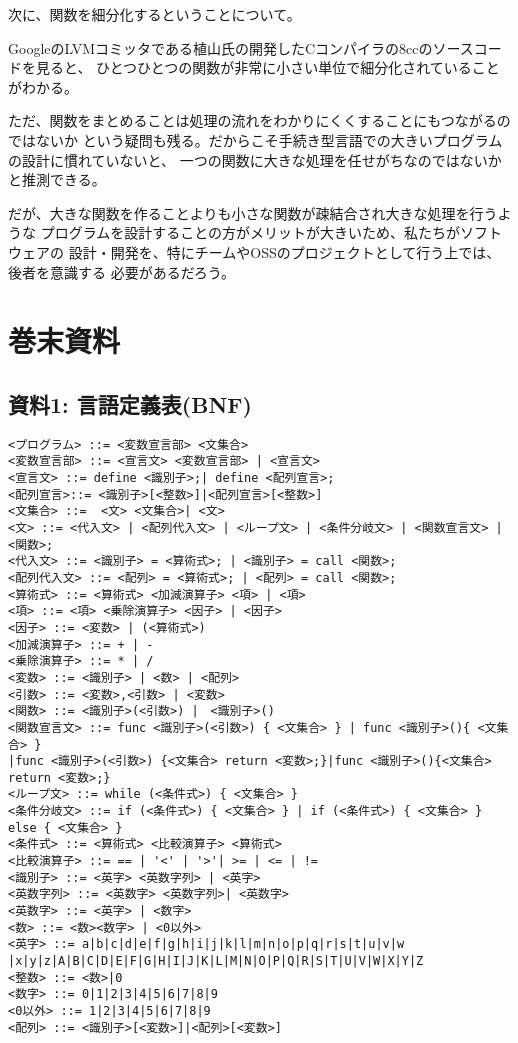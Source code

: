 \documentclass[11pt,a4j]{jarticle}
\begin{document}
\vspace{0.2in}

次に、関数を細分化するということについて。

GoogleのLVMコミッタである植山氏の開発したCコンパイラの8ccのソースコードを見ると、
ひとつひとつの関数が非常に小さい単位で細分化されていることがわかる。

ただ、関数をまとめることは処理の流れをわかりにくくすることにもつながるのではないか
という疑問も残る。だからこそ手続き型言語での大きいプログラムの設計に慣れていないと、
一つの関数に大きな処理を任せがちなのではないかと推測できる。

だが、大きな関数を作ることよりも小さな関数が疎結合され大きな処理を行うような
プログラムを設計することの方がメリットが大きいため、私たちがソフトウェアの
設計・開発を、特にチームやOSSのプロジェクトとして行う上では、後者を意識する
必要があるだろう。


\newpage


\section{巻末資料}

\subsection{資料1: 言語定義表(BNF)}

{\baselineskip 2mm
\begin{verbatim}
<プログラム> ::= <変数宣言部> <文集合>
<変数宣言部> ::= <宣言文> <変数宣言部> | <宣言文>
<宣言文> ::= define <識別子>;| define <配列宣言>;
<配列宣言>::= <識別子>[<整数>]|<配列宣言>[<整数>]
<文集合> ::=  <文> <文集合>| <文>
<文> ::= <代入文> | <配列代入文> | <ループ文> | <条件分岐文> | <関数宣言文> | <関数>;
<代入文> ::= <識別子> = <算術式>; | <識別子> = call <関数>; 
<配列代入文> ::= <配列> = <算術式>; | <配列> = call <関数>;
<算術式> ::= <算術式> <加減演算子> <項> | <項>
<項> ::= <項> <乗除演算子> <因子> | <因子>
<因子> ::= <変数> | (<算術式>)
<加減演算子> ::= + | -
<乗除演算子> ::= * | /
<変数> ::= <識別子> | <数> | <配列>
<引数> ::= <変数>,<引数> | <変数>
<関数> ::= <識別子>(<引数>) |　<識別子>()
<関数宣言文> ::= func <識別子>(<引数>) { <文集合> } | func <識別子>(){ <文集合> }
|func <識別子>(<引数>) {<文集合> return <変数>;}|func <識別子>(){<文集合> return <変数>;}
<ループ文> ::= while (<条件式>) { <文集合> }
<条件分岐文> ::= if (<条件式>) { <文集合> } | if (<条件式>) { <文集合> } else { <文集合> }
<条件式> ::= <算術式> <比較演算子> <算術式>
<比較演算子> ::= == | '<' | '>'| >= | <= | !=
<識別子> ::= <英字> <英数字列> | <英字>
<英数字列> ::= <英数字> <英数字列>| <英数字>
<英数字> ::= <英字> | <数字>
<数> ::= <数><数字> | <0以外>
<英字> ::= a|b|c|d|e|f|g|h|i|j|k|l|m|n|o|p|q|r|s|t|u|v|w
|x|y|z|A|B|C|D|E|F|G|H|I|J|K|L|M|N|O|P|Q|R|S|T|U|V|W|X|Y|Z
<整数> ::= <数>|0
<数字> ::= 0|1|2|3|4|5|6|7|8|9
<0以外> ::= 1|2|3|4|5|6|7|8|9
<配列> ::= <識別子>[<変数>]|<配列>[<変数>]
\end{verbatim}}
\end{document}
